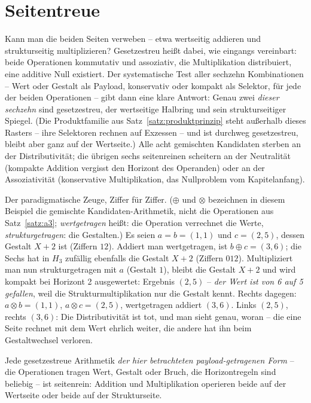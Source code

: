 \section{Seitentreue}
\label{sec:seitentreue}

Kann man die beiden Seiten verweben -- etwa wertseitig addieren und
strukturseitig multiplizieren? Gesetzestreu heißt dabei, wie
eingangs vereinbart: beide Operationen kommutativ und assoziativ,
die Multiplikation distribuiert, eine additive Null existiert. Der
systematische Test aller sechzehn Kombinationen -- Wert oder
Gestalt als Payload, konservativ oder kompakt als Selektor, für
jede der beiden Operationen -- gibt dann eine klare Antwort: Genau
zwei \emph{dieser sechzehn} sind gesetzestreu, der wertseitige
Halbring und sein strukturseitiger Spiegel. (Die Produktfamilie aus
Satz~\ref{satz:produktprinzip} steht außerhalb dieses Rasters --
ihre Selektoren rechnen auf Exzessen -- und ist durchweg
gesetzestreu, bleibt aber ganz auf der Wertseite.) Alle acht gemischten
Kandidaten sterben an der Distributivität; die übrigen sechs
seitenreinen scheitern an der Neutralität (kompakte Addition
vergisst den Horizont des Operanden) oder an der Assoziativität
(konservative Multiplikation, das Nullproblem vom Kapitelanfang).

\begin{beispiel}
Der paradigmatische Zeuge, Ziffer für Ziffer. ($\oplus$ und
$\otimes$ bezeichnen in diesem Beispiel die gemischte
Kandidaten-Arithmetik, nicht die Operationen aus
Satz~\ref{satz:a3}; \emph{wertgetragen} heißt: die Operation
verrechnet die Werte, \emph{strukturgetragen}: die Gestalten.)
Es seien $a=b=(1,1)$ und
$c=(2,5)$, dessen Gestalt $X+2$ ist (Ziffern $12$). Addiert man
wertgetragen, ist $b\oplus c=(3,6)$; die Sechs hat in $H_3$
zufällig ebenfalls die Gestalt $X+2$ (Ziffern $012$). Multipliziert
man nun strukturgetragen mit $a$ (Gestalt $1$), bleibt die Gestalt
$X+2$ und wird kompakt bei Horizont 2 ausgewertet: Ergebnis
$(2,5)$ -- \emph{der Wert ist von 6 auf 5 gefallen}, weil die
Strukturmultiplikation nur die Gestalt kennt. Rechts dagegen:
$a\otimes b=(1,1)$, $a\otimes c=(2,5)$, wertgetragen addiert
$(3,6)$. Links $(2,5)$, rechts $(3,6)$: Die Distributivität ist
tot, und man sieht genau, woran -- die eine Seite rechnet mit dem
Wert ehrlich weiter, die andere hat ihn beim Gestaltwechsel
verloren.
\end{beispiel}

\begin{satz}\label{satz:seitentreue}
Jede gesetzestreue Arithmetik \emph{der hier betrachteten
payload-getra\-genen Form} -- die Operationen tragen Wert, Gestalt
oder Bruch, die Horizontregeln sind beliebig -- ist seitenrein:
Addition und Multiplikation operieren beide auf der Wertseite oder
beide auf der Strukturseite.
\end{satz}

